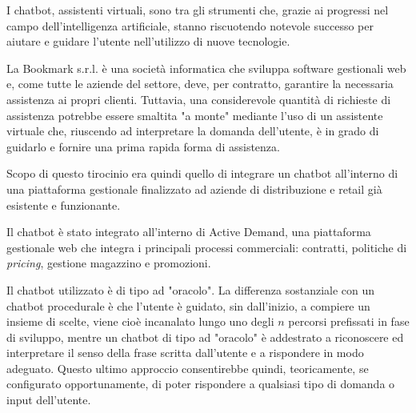 I chatbot, assistenti virtuali, sono tra gli strumenti che, grazie ai progressi nel campo dell'intelligenza artificiale, stanno riscuotendo notevole successo per aiutare e guidare l'utente nell'utilizzo di nuove tecnologie.

La Bookmark s.r.l. è una società informatica che sviluppa software gestionali web e, come tutte le aziende del settore, deve, per contratto, garantire la necessaria assistenza ai propri clienti. 
%
Tuttavia, una considerevole quantità di richieste di assistenza potrebbe essere smaltita "a monte" mediante l'uso di un assistente virtuale che, riuscendo ad interpretare la domanda dell'utente, è in grado di guidarlo e fornire una prima rapida forma di assistenza.

Scopo di questo tirocinio era quindi quello di integrare un chatbot all'interno di una piattaforma gestionale finalizzato ad aziende di distribuzione e retail già esistente e funzionante.

Il chatbot è stato integrato all'interno di Active Demand, una piattaforma gestionale web che integra i principali processi commerciali: contratti, politiche di \textit{pricing}, gestione magazzino e promozioni.

Il chatbot utilizzato è di tipo ad "oracolo".
%
La differenza sostanziale con un chatbot procedurale è che l'utente è guidato, sin dall'inizio, a compiere un insieme di scelte, viene cioè incanalato lungo uno degli $n$ percorsi prefissati in fase di sviluppo, mentre un chatbot di tipo ad "oracolo" è addestrato a riconoscere ed interpretare il senso della frase scritta dall'utente e a rispondere in modo adeguato.
%
Questo ultimo approccio consentirebbe quindi, teoricamente, se configurato opportunamente, di poter rispondere a qualsiasi tipo di domanda o input dell'utente.

